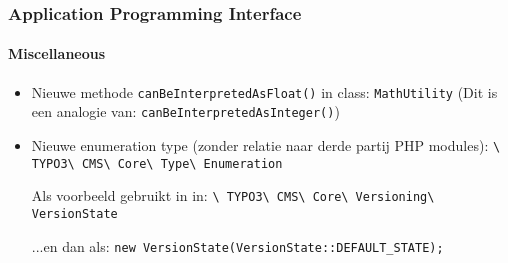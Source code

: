 \begin{frame}[fragile]
	\frametitle{Application Programming Interface}
	\framesubtitle{Miscellaneous}

	\begin{itemize}
		\item Nieuwe methode \texttt{canBeInterpretedAsFloat()} in class: \texttt{MathUtility}\newline
			\small(Dit is een analogie van: \texttt{canBeInterpretedAsInteger()})\normalsize
		\item Nieuwe enumeration type (zonder relatie naar derde partij PHP modules):\newline
			\texttt{\textbackslash
				TYPO3\textbackslash
				CMS\textbackslash
				Core\textbackslash
				Type\textbackslash
				Enumeration}\newline

			Als voorbeeld gebruikt in in:\newline
			\texttt{\textbackslash
				TYPO3\textbackslash
				CMS\textbackslash
				Core\textbackslash
				Versioning\textbackslash
				VersionState}\newline

			...en dan als:\newline
			\texttt{new VersionState(VersionState::DEFAULT\_STATE);}

	\end{itemize}

\end{frame}


